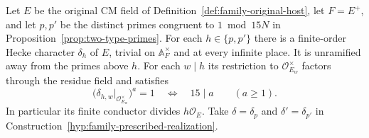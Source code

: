 \begin{auxlemma}
\label{lem:split-deletion-characters}
Let \(E\) be the original CM field of
Definition~\ref{def:family-original-host}, let \(F=E^+\), and let
\(p,p'\) be the distinct primes congruent to \(1\bmod 15N\) in
Proposition~\ref{prop:two-type-primes}. For each \(h\in\{p,p'\}\)
there is a finite-order Hecke character \(\delta_h\) of \(E\),
trivial on \(\mathbb A_F^\times\) and at every infinite place.
It is unramified away from the primes above \(h\). For each \(w\mid h\)
its restriction to \(\mathcal O_{E_w}^\times\) factors through the
residue field and satisfies
\[
       \bigl(\delta_{h,w}|_{\mathcal O_{E_w}^\times}\bigr)^a=1
                   \quad\Longleftrightarrow\quad 15\mid a
                   \qquad(a\ge1).
\]
In particular its finite conductor divides \(h\mathcal O_E\).
Take \(\delta=\delta_p\) and \(\delta'=\delta_{p'}\) in
Construction~\ref{hyp:family-prescribed-realization}.
\end{auxlemma}

